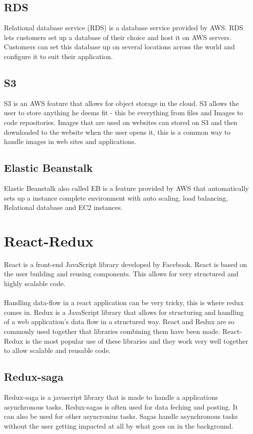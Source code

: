 \subsection{RDS}
Relational database service (RDS) is a database service provided by AWS. RDS lets customers set up a database of their choice and host it on AWS servers. Customers can set this database up on several locations across the world and configure it to suit their application. \cite{AWSDoc}
\subsection{S3}
S3 is an AWS feature that allows for object storage in the cloud. S3 allows the user to store anything he deems fit - this be everything from files and Images to code repositories. Images that are used on websites can stored on S3 and then downloaded to the website when the user opens it, this is a common way to handle images in web sites and applications. \cite{AWSDoc}
\subsection{Elastic Beanstalk}
Elastic Beanstalk also called EB is a feature provided by AWS that automatically sets up a instance complete environment with auto scaling, load balancing, Relational database and EC2 instances. \cite{AWSDoc}
\section{React-Redux}
React is a front-end JavaScript library developed by Facebook. React is based on the user building and reusing components. This allows for very structured and highly scalable code.
\\\\
Handling data-flow in a react application can be very tricky, this is where redux comes in. Redux is a JavaScript library that allows for structuring and handling of a web application's data flow in a structured way. React and Redux are so commonly used together that libraries combining them have been made. React-Redux is the most popular use of these libraries and they work very well together to allow scalable and reusable code.  \cite{react} \cite{redux}
\subsection{Redux-saga}
Redux-saga is a javascript library that is made to handle a applications asynchronous tasks. Redux-sagas is often used for data feching and posting. It can also be used for other asyncronius tasks. Sagas handle asynchronous tasks without the user getting impacted at all by what goes on in the background. \cite{redux-saga}

